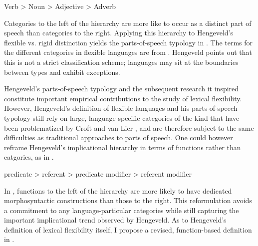 \begin{exe}
  \ex\label{ex:2.3} Verb > Noun > Adjective > Adverb
\end{exe}

\noindent Categories to the left of the hierarchy are more like to occur as a distinct part of speech than categories to the right. Applying this hierarchy to Hengeveld's flexible vs. rigid distinction yields the parts-of-speech typology in  . The terms for the different categories in flexible languages are from \textcite{HengeveldRijkhoffSiewierska2004}. Hengeveld points out that this is not a strict classification scheme; languages may sit at the boundaries between types and exhibit exceptions.


Hengeveld's parts-of-speech typology and the subsequent research it inspired \parencites{DonLier2003}{HengeveldRijkhoff2005}{Lier2006}{HengeveldLier2010}{Luuk2010}{LierRijkhoff2013}{Lier2016} constitute important empirical contributions to the study of lexical flexibility. However, Hengeveld's definition of flexible languages and his parts-of-speech typology still rely on large, language-specific categories of the kind that have been problematized by Croft  and van Lier \parencite{CroftLier2012}, and are therefore subject to the same difficulties as traditional approaches to parts of speech. One could however reframe Hengeveld's implicational hierarchy in terms of functions rather than catgories, as in .

\begin{exe}
  \ex\label{ex:2.3} predicate > referent > predicate modifier > referent modifier
\end{exe}

\noindent In , functions to the left of the hierarchy are more likely to have dedicated morphosyntactic constructions than those to the right. This reformulation avoids a commitment to any language-particular categories while still capturing the important implicational trend observed by Hengeveld. As to Hengeveld's definition of lexical flexibility itself, I propose a revised, function-based definition in  .

